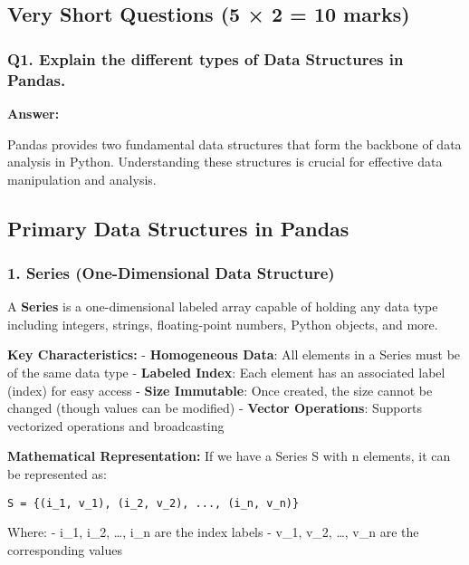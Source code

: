 \documentclass[11pt]{article}
\begin{document}
    \subsection{Very Short Questions (5 × 2 = 10
marks)}\label{very-short-questions-5-2-10-marks}

\subsubsection{Q1. Explain the different types of Data Structures in
Pandas.}\label{q1.-explain-the-different-types-of-data-structures-in-pandas.}

    \textbf{Answer:}

Pandas provides two fundamental data structures that form the backbone
of data analysis in Python. Understanding these structures is crucial
for effective data manipulation and analysis.

\subsection{Primary Data Structures in
Pandas}\label{primary-data-structures-in-pandas}

\subsubsection{1. Series (One-Dimensional Data
Structure)}\label{series-one-dimensional-data-structure}

A \textbf{Series} is a one-dimensional labeled array capable of holding
any data type including integers, strings, floating-point numbers,
Python objects, and more.

\textbf{Key Characteristics:} - \textbf{Homogeneous Data}: All elements
in a Series must be of the same data type - \textbf{Labeled Index}: Each
element has an associated label (index) for easy access - \textbf{Size
Immutable}: Once created, the size cannot be changed (though values can
be modified) - \textbf{Vector Operations}: Supports vectorized
operations and broadcasting

\textbf{Mathematical Representation:} If we have a Series S with n
elements, it can be represented as:

\begin{verbatim}
S = {(i_1, v_1), (i_2, v_2), ..., (i_n, v_n)}
\end{verbatim}

Where: - i\_1, i\_2, \ldots, i\_n are the index labels - v\_1, v\_2,
\ldots, v\_n are the corresponding values
\end{document}
